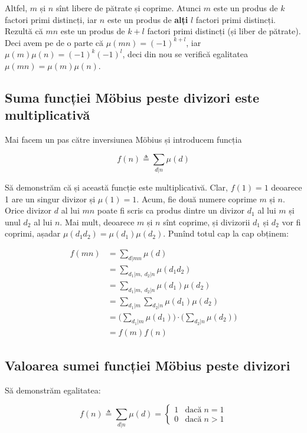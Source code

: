 \documentclass[../main.tex]{subfiles}
\begin{document}
Altfel, $m$ și $n$ sînt libere de pătrate și coprime. Atunci $m$ este un produs de $k$ factori primi distincți, iar $n$ este un produs de \textbf{alți} $l$ factori primi distincți. Rezultă că $mn$ este un produs de $k+l$ factori primi distincți (și liber de pătrate). Deci avem pe de o parte că $\mu(mn) = (-1)^{k+l}$, iar $\mu(m)\mu(n) = (-1)^k (-1)^l$, deci din nou se verifică egalitatea $\mu(mn) = \mu(m)\mu(n)$.

\subsection{Suma funcției Möbius peste divizori este multiplicativă}

Mai facem un pas către inversiunea Möbius și introducem funcția

$$f(n) \triangleq \sum_{d|n} \mu(d)$$

Să demonstrăm că și această funcție este multiplicativă. Clar, $f(1) = 1$ deoarece 1 are un singur divizor și $\mu(1) = 1$. Acum, fie două numere coprime $m$ și $n$. Orice divizor $d$ al lui $mn$ poate fi scris ca produs dintre un divizor $d_1$ al lui $m$ și unul $d_2$ al lui $n$. Mai mult, deoarece $m$ și $n$ sînt coprime, și divizorii $d_1$ și $d_2$ vor fi coprimi, așadar $\mu(d_1 d_2) = \mu(d_1) \mu(d_2)$. Punînd totul cap la cap obținem:

\begin{align*}
f(mn) &= \sum_{d|mn} \mu(d) \\
&= \sum_{d_1 | m,\ d_2 | n} \mu(d_1 d_2) \\
&= \sum_{d_1 | m,\ d_2 | n} \mu(d_1) \mu(d_2) \\
&= \sum_{d_1|m} \sum_{d_2|n} \mu(d_1)\mu(d_2) \\
&= \Big( \sum_{d_1|m} \mu(d_1) \Big) \cdot \Big( \sum_{d_2|n} \mu(d_2) \Big) \\
&= f(m) f(n)
\end{align*}

\subsection{Valoarea sumei funcției Möbius peste divizori}

Să demonstrăm egalitatea:

$$
f(n) \triangleq \sum_{d|n} \mu(d) =
\begin{cases}
1 & \textrm{dacă} \; n = 1\\
0 & \textrm{dacă} \; n > 1
\end{cases}
$$
\end{document}
